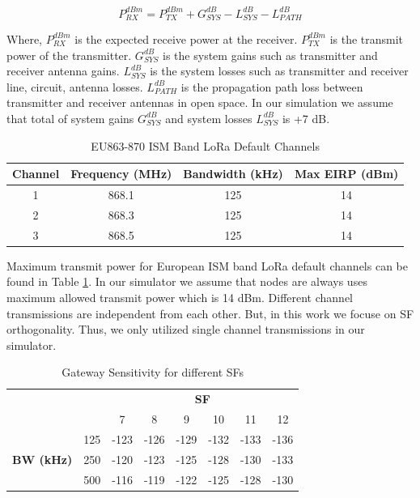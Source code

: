 \documentclass[conference]{IEEEtran}
\begin{document}
\begin{equation} \label{eq:expected_rx_power}
P^{dBm}_{RX} = P^{dBm}_{TX} + G^{dB}_{SYS} - L^{dB}_{SYS} - L^{dB}_{PATH}
\end{equation}

\par Where, $P^{dBm}_{RX}$ is the expected receive power at the receiver. $P^{dBm}_{TX}$ is the transmit power of the transmitter. $G^{dB}_{SYS}$ is the system gains such as transmitter and receiver antenna gains. $L^{dB}_{SYS}$ is the system losses such as transmitter and receiver line, circuit, antenna losses. $L^{dB}_{PATH}$ is the propagation path loss between transmitter and receiver antennas in open space. In our simulation we assume that total of system gains $G^{dB}_{SYS}$ and system losses $L^{dB}_{SYS}$ is +7 dB.

\begin{table}
\centering
\caption{EU863-870 ISM Band LoRa Default Channels \cite{lorawan.regional.parameters}}
\label{table:max_tx_power}
\begin{tabular}{|c|c|c|c|}
\hline
\textbf{Channel} & \textbf{Frequency (MHz)} & \textbf{Bandwidth (kHz)} & \textbf{Max EIRP (dBm)} \\ \hline
      1 &     868.1 &   125 &   14 \\ \hline
      2 &     868.3 &   125 &   14 \\ \hline
      3 &     868.5 &   125 &   14 \\

\hline
\end{tabular}
\end{table}

\par Maximum transmit power for European ISM band LoRa default channels can be found in Table \ref{table:max_tx_power}. In our simulator we assume that nodes are always uses maximum allowed transmit power which is 14 dBm. Different channel transmissions are independent from each other. But, in this work we focuse on SF orthogonality. Thus, we only utilized single channel transmissions in our simulator.

\begin{table}
\centering
\caption{Gateway Sensitivity for different SFs \cite{SX1276}}
\label{table:gw_sf_sensitivity}
\begin{tabular}{|c|c|c|c|c|c|c|c|}
\hline
\multicolumn{2}{|c|}{\multirow{2}{*}{}} & \multicolumn{6}{c|}{\textbf{SF}} \\ \cline{3-8}
\multicolumn{2}{|c|}{}                  &    7 &    8 &    9 &   10 &   11 &   12 \\ \hline
\multirow{3}{*}{\textbf{BW (kHz)}}  & 125 & -123 & -126 & -129 & -132 & -133 & -136 \\ \cline{2-8}
                                    & 250 & -120 & -123 & -125 & -128 & -130 & -133 \\ \cline{2-8}
                                    & 500 & -116 & -119 & -122 & -125 & -128 & -130 \\ \hline
\end{tabular}
\end{table}
\end{document}
